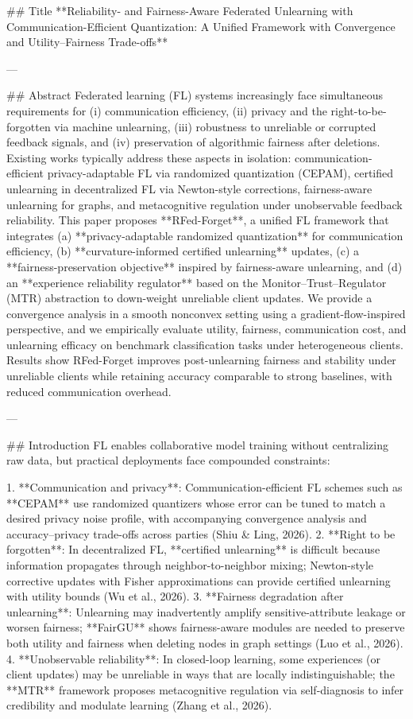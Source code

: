 ## Title  
**Reliability- and Fairness-Aware Federated Unlearning with Communication-Efficient Quantization: A Unified Framework with Convergence and Utility–Fairness Trade-offs**

---

## Abstract  
Federated learning (FL) systems increasingly face simultaneous requirements for (i) communication efficiency, (ii) privacy and the right-to-be-forgotten via machine unlearning, (iii) robustness to unreliable or corrupted feedback signals, and (iv) preservation of algorithmic fairness after deletions. Existing works typically address these aspects in isolation: communication-efficient privacy-adaptable FL via randomized quantization (CEPAM), certified unlearning in decentralized FL via Newton-style corrections, fairness-aware unlearning for graphs, and metacognitive regulation under unobservable feedback reliability. This paper proposes **RFed-Forget**, a unified FL framework that integrates (a) **privacy-adaptable randomized quantization** for communication efficiency, (b) **curvature-informed certified unlearning** updates, (c) a **fairness-preservation objective** inspired by fairness-aware unlearning, and (d) an **experience reliability regulator** based on the Monitor–Trust–Regulator (MTR) abstraction to down-weight unreliable client updates. We provide a convergence analysis in a smooth nonconvex setting using a gradient-flow-inspired perspective, and we empirically evaluate utility, fairness, communication cost, and unlearning efficacy on benchmark classification tasks under heterogeneous clients. Results show RFed-Forget improves post-unlearning fairness and stability under unreliable clients while retaining accuracy comparable to strong baselines, with reduced communication overhead.

---

## Introduction  
FL enables collaborative model training without centralizing raw data, but practical deployments face compounded constraints:

1. **Communication and privacy**: Communication-efficient FL schemes such as **CEPAM** use randomized quantizers whose error can be tuned to match a desired privacy noise profile, with accompanying convergence analysis and accuracy–privacy trade-offs across parties (Shiu & Ling, 2026).  
2. **Right to be forgotten**: In decentralized FL, **certified unlearning** is difficult because information propagates through neighbor-to-neighbor mixing; Newton-style corrective updates with Fisher approximations can provide certified unlearning with utility bounds (Wu et al., 2026).  
3. **Fairness degradation after unlearning**: Unlearning may inadvertently amplify sensitive-attribute leakage or worsen fairness; **FairGU** shows fairness-aware modules are needed to preserve both utility and fairness when deleting nodes in graph settings (Luo et al., 2026).  
4. **Unobservable reliability**: In closed-loop learning, some experiences (or client updates) may be unreliable in ways that are locally indistinguishable; the **MTR** framework proposes metacognitive regulation via self-diagnosis to infer credibility and modulate learning (Zhang et al., 2026).

